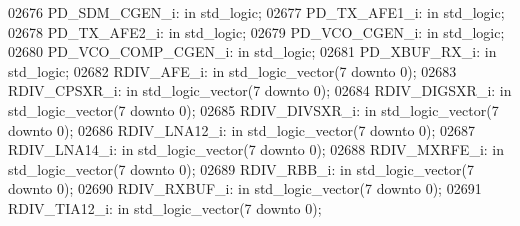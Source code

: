 \begin{DoxyCode}
02676     PD\_SDM\_CGEN\_i:  \textcolor{keywordflow}{in} \textcolor{comment}{std\_logic};
02677     PD\_TX\_AFE1\_i:   \textcolor{keywordflow}{in} \textcolor{comment}{std\_logic};
02678     PD\_TX\_AFE2\_i:   \textcolor{keywordflow}{in} \textcolor{comment}{std\_logic};
02679     PD\_VCO\_CGEN\_i:  \textcolor{keywordflow}{in} \textcolor{comment}{std\_logic};
02680     PD\_VCO\_COMP\_CGEN\_i: \textcolor{keywordflow}{in} \textcolor{comment}{std\_logic};
02681     PD\_XBUF\_RX\_i:   \textcolor{keywordflow}{in} \textcolor{comment}{std\_logic};
02682     RDIV\_AFE\_i: \textcolor{keywordflow}{in} \textcolor{comment}{std\_logic\_vector}(\textcolor{vhdllogic}{}\textcolor{vhdllogic}{7} \textcolor{keywordflow}{downto} \textcolor{vhdllogic}{}\textcolor{vhdllogic}{0});
02683     RDIV\_CPSXR\_i:   \textcolor{keywordflow}{in} \textcolor{comment}{std\_logic\_vector}(\textcolor{vhdllogic}{}\textcolor{vhdllogic}{7} \textcolor{keywordflow}{downto} \textcolor{vhdllogic}{}\textcolor{vhdllogic}{0});
02684     RDIV\_DIGSXR\_i:  \textcolor{keywordflow}{in} \textcolor{comment}{std\_logic\_vector}(\textcolor{vhdllogic}{}\textcolor{vhdllogic}{7} \textcolor{keywordflow}{downto} \textcolor{vhdllogic}{}\textcolor{vhdllogic}{0});
02685     RDIV\_DIVSXR\_i:  \textcolor{keywordflow}{in} \textcolor{comment}{std\_logic\_vector}(\textcolor{vhdllogic}{}\textcolor{vhdllogic}{7} \textcolor{keywordflow}{downto} \textcolor{vhdllogic}{}\textcolor{vhdllogic}{0});
02686     RDIV\_LNA12\_i:   \textcolor{keywordflow}{in} \textcolor{comment}{std\_logic\_vector}(\textcolor{vhdllogic}{}\textcolor{vhdllogic}{7} \textcolor{keywordflow}{downto} \textcolor{vhdllogic}{}\textcolor{vhdllogic}{0});
02687     RDIV\_LNA14\_i:   \textcolor{keywordflow}{in} \textcolor{comment}{std\_logic\_vector}(\textcolor{vhdllogic}{}\textcolor{vhdllogic}{7} \textcolor{keywordflow}{downto} \textcolor{vhdllogic}{}\textcolor{vhdllogic}{0});
02688     RDIV\_MXRFE\_i:   \textcolor{keywordflow}{in} \textcolor{comment}{std\_logic\_vector}(\textcolor{vhdllogic}{}\textcolor{vhdllogic}{7} \textcolor{keywordflow}{downto} \textcolor{vhdllogic}{}\textcolor{vhdllogic}{0});
02689     RDIV\_RBB\_i: \textcolor{keywordflow}{in} \textcolor{comment}{std\_logic\_vector}(\textcolor{vhdllogic}{}\textcolor{vhdllogic}{7} \textcolor{keywordflow}{downto} \textcolor{vhdllogic}{}\textcolor{vhdllogic}{0});
02690     RDIV\_RXBUF\_i:   \textcolor{keywordflow}{in} \textcolor{comment}{std\_logic\_vector}(\textcolor{vhdllogic}{}\textcolor{vhdllogic}{7} \textcolor{keywordflow}{downto} \textcolor{vhdllogic}{}\textcolor{vhdllogic}{0});
02691     RDIV\_TIA12\_i:   \textcolor{keywordflow}{in} \textcolor{comment}{std\_logic\_vector}(\textcolor{vhdllogic}{}\textcolor{vhdllogic}{7} \textcolor{keywordflow}{downto} \textcolor{vhdllogic}{}\textcolor{vhdllogic}{0});

\end{DoxyCode}

